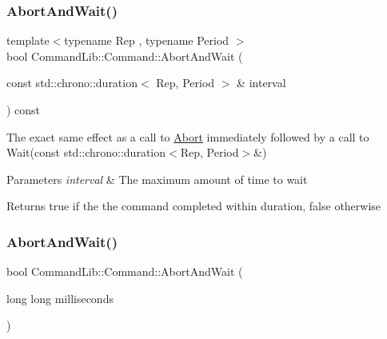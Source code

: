 \subsubsection{\texorpdfstring{Abort\+And\+Wait()}{AbortAndWait()}\hspace{0.1cm}{\footnotesize\ttfamily [2/3]}}
{\footnotesize\ttfamily template$<$typename Rep , typename Period $>$ \\
bool Command\+Lib\+::\+Command\+::\+Abort\+And\+Wait (\begin{DoxyParamCaption}\item[{const std\+::chrono\+::duration$<$ Rep, Period $>$ \&}]{interval }\end{DoxyParamCaption}) const\hspace{0.3cm}{\ttfamily [inline]}}



The exact same effect as a call to \mbox{\hyperlink{class_command_lib_1_1_command_a247cbc7325e3b9d9d7044d449b989aa6}{Abort}} immediately followed by a call to Wait(const std\+::chrono\+::duration$<$\+Rep, Period$>$\&) 


\begin{DoxyParams}{Parameters}
{\em interval} & The maximum amount of time to wait\\
\hline
\end{DoxyParams}
\begin{DoxyReturn}{Returns}
true if the the command completed within \textquotesingle{}duration\textquotesingle{}, false otherwise
\end{DoxyReturn}
\mbox{\label{class_command_lib_1_1_command_ab7e0fd4eb4f1d2b6d98228c1432805e3}} 
\subsubsection{\texorpdfstring{Abort\+And\+Wait()}{AbortAndWait()}\hspace{0.1cm}{\footnotesize\ttfamily [3/3]}}
{\footnotesize\ttfamily bool Command\+Lib\+::\+Command\+::\+Abort\+And\+Wait (\begin{DoxyParamCaption}\item[{long long}]{milliseconds }\end{DoxyParamCaption})}



